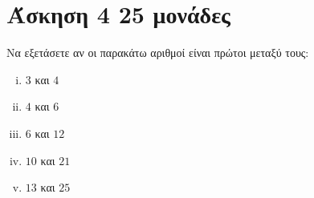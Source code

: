 \documentclass[a4paper,10pt]{report}
\begin{document}
\section*{Άσκηση 4  \hfill \small{} 25 μονάδες}
Να εξετάσετε αν οι παρακάτω αριθμοί είναι πρώτοι μεταξύ τους:
\begin{enumerate}[i)]
 \item $3$ και $4$
 \item $4$ και $6$
 \item $6$ και $12$
 \item $10$ και $21$
 \item $13$ και $25$
\end{enumerate}




\end{document}
